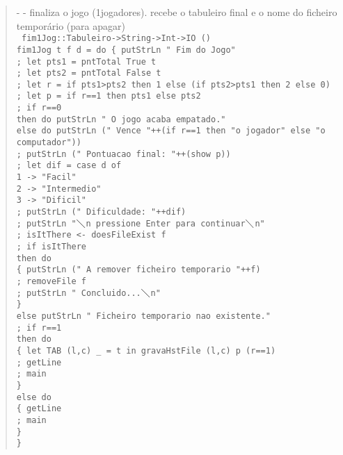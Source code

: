 \documentclass[a4paper,titlepage]{scrreprt}
\begin{document}
		\begin{quote}
			{\small - - finaliza o jogo (1jogadores). recebe o tabuleiro final e o nome do ficheiro temporário (para apagar)\\}
			{\tt
			fim1Jog::Tabuleiro->String->Int->IO ()\\
			fim1Jog t f d = do
			\{ putStrLn " Fim do Jogo"\\
			; let pts1 = pntTotal True t\\
			; let pts2 = pntTotal False t\\
			; let r = if pts1>pts2 then 1 else (if pts2>pts1 then 2 else 0)\\
			; let p = if r==1 then pts1 else pts2\\
			; if r==0\\
			then do putStrLn " O jogo acaba empatado."\\
			else do	putStrLn (" Vence "++(if r==1 then "o jogador" else "o computador"))\\
			; putStrLn (" Pontuacao final: "++(show p))\\
			; let dif = case d of\\
			1 -> "Facil"\\
			2 -> "Intermedio"\\
			3 -> "Dificil"\\
			; putStrLn (" Dificuldade: "++dif)\\
			; putStrLn "$\diagdown$n pressione Enter para continuar$\diagdown$n"\\
			; isItThere <- doesFileExist f\\
			; if isItThere\\
			then do\\
			\{ putStrLn (" A remover ficheiro temporario "++f)\\
			; removeFile f\\
			; putStrLn " Concluido...$\diagdown$n"\\
			\}\\
			else putStrLn " Ficheiro temporario nao existente."\\
			; if r==1\\
			then do\\
			\{ let TAB (l,c) \_ = t in gravaHstFile (l,c) p (r==1)\\
			; getLine\\
			; main\\
			\}\\
			else do\\
			\{ getLine\\
			; main\\
			\}\\
			\}\\
			}
		\end{quote}
\end{document}
